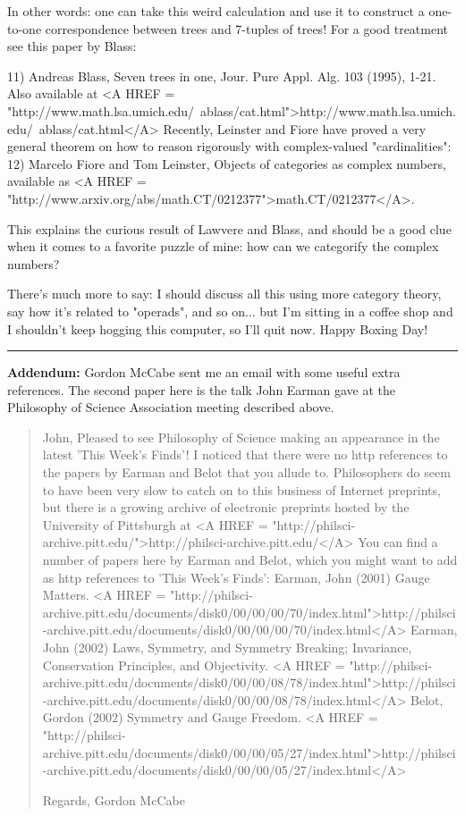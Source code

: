 In other words: one can take this weird calculation and use it
to construct a one-to-one correspondence between trees and 
7-tuples of trees!  For a good treatment see this paper by Blass:

11) Andreas Blass, Seven trees in one, Jour. Pure Appl. Alg. 103 (1995), 
1-21.  Also available at <A HREF = "http://www.math.lsa.umich.edu/~ablass/cat.html">http://www.math.lsa.umich.edu/~ablass/cat.html</A>
Recently, Leinster and Fiore have proved a very general theorem 
on how to reason rigorously with complex-valued "cardinalities":
12) Marcelo Fiore and Tom Leinster, Objects of categories as
complex numbers, available as <A HREF = "http://www.arxiv.org/abs/math.CT/0212377">math.CT/0212377</A>.

This explains the curious result of Lawvere and Blass, and
should be a good clue when it comes to a favorite puzzle of
mine: how can we categorify the complex numbers?

There's much more to say: I should discuss all this using more 
category theory, say how it's related to "operads", and so on...
but I'm sitting in a coffee shop and I shouldn't keep hogging
this computer, so I'll quit now.   Happy Boxing Day!

\par\noindent\rule{\textwidth}{0.4pt}
\textbf{Addendum:} Gordon McCabe sent me an email with some useful
extra references.  The second paper here is the talk John Earman 
gave at the Philosophy of Science Association meeting described above.

\begin{quote}
John,
Pleased to see Philosophy of Science making an appearance in the latest
'This Week's Finds'!
I noticed that there were no http references to the papers by Earman and
Belot that you allude to. Philosophers do seem to have been very slow to
catch on to this business of Internet preprints, but there is a growing
archive of electronic preprints hosted by the University of Pittsburgh at
<A HREF = "http://philsci-archive.pitt.edu/">http://philsci-archive.pitt.edu/</A>
    You can find a number of papers here by
Earman and Belot, which you might want to add as http references to 'This
Week's Finds':
Earman, John (2001) Gauge Matters.
<A HREF = "http://philsci-archive.pitt.edu/documents/disk0/00/00/00/70/index.html">http://philsci-archive.pitt.edu/documents/disk0/00/00/00/70/index.html</A>
Earman, John (2002) Laws, Symmetry, and Symmetry Breaking; Invariance,
Conservation Principles, and Objectivity.
<A HREF = "http://philsci-archive.pitt.edu/documents/disk0/00/00/08/78/index.html">http://philsci-archive.pitt.edu/documents/disk0/00/00/08/78/index.html</A>
Belot, Gordon (2002) Symmetry and Gauge Freedom.
<A HREF = "http://philsci-archive.pitt.edu/documents/disk0/00/00/05/27/index.html">http://philsci-archive.pitt.edu/documents/disk0/00/00/05/27/index.html</A>

Regards,
Gordon McCabe
\end{quote}



